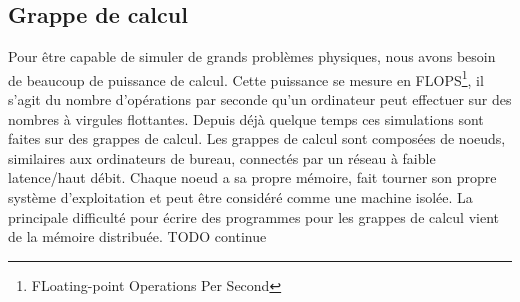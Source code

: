 \subsection{Grappe de calcul}
Pour être capable de simuler de grands problèmes physiques, nous avons besoin de beaucoup de puissance de calcul.
%
Cette puissance se mesure en FLOPS\footnote{FLoating-point Operations Per Second}, il s'agit du nombre d'opérations par seconde qu'un ordinateur peut effectuer sur des nombres à virgules flottantes.
%
Depuis déjà quelque temps ces simulations sont faites sur des grappes de calcul.
%
Les grappes de calcul sont composées de noeuds, similaires aux ordinateurs de bureau, connectés par un réseau à faible latence/haut débit.
%
Chaque noeud a sa propre mémoire, fait tourner son propre système d'exploitation et peut être considéré comme une machine isolée.
%
La principale difficulté pour écrire des programmes pour les grappes de calcul vient de la mémoire distribuée. TODO continue
